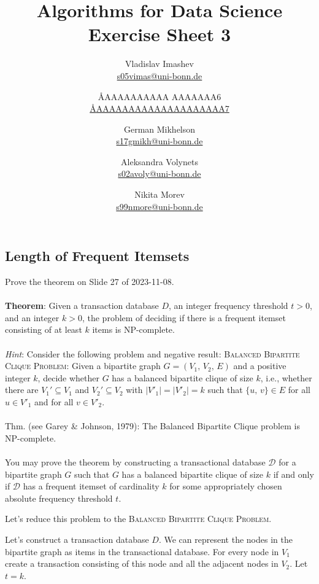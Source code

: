 \documentclass{article}
\title{Algorithms for Data Science \\ Exercise Sheet 3}
\author{
  Vladislav Imashev \\ \href{mailto:s05vimas@uni-bonn.de}{s05vimas@uni-bonn.de} \and
  \AA{AAAAAAAAAA AAAAAAA}{6} \\ \href{mailto:\AA{AAAAAAAAAAAAAAAAAAAA}{7}}{\AA{AAAAAAAAAAAAAAAAAAAA}{7}} \and
  German Mikhelson \\ \href{mailto:s17gmikh@uni-bonn.de}{s17gmikh@uni-bonn.de} \and
  Aleksandra Volynets \\ \href{mailto:s02avoly@uni-bonn.de}{s02avoly@uni-bonn.de} \and
  Nikita Morev \\ \href{mailto:s99nmore@uni-bonn.de}{s99nmore@uni-bonn.de}
}
\begin{document}
  \maketitle

  \setcounter{section}{3}
  \subsection{Length of Frequent Itemsets}
  \begin{centerframebox}
    Prove the theorem on Slide 27 of 2023-11-08.
    \\\\
    \textbf{Theorem}:
    Given a transaction database $D$, an integer frequency threshold $t > 0$, and an integer $k > 0$,
    the problem of deciding if there is a frequent itemset consisting of at least $k$ items is NP-complete.
    \\\\
    \textit{Hint}: Consider the following problem and negative result:
    \textsc{Balanced Bipartite Clique Problem}:
    Given a bipartite graph $G = (V_1,\, V_2,\, E)$ and a positive integer $k$, decide whether $G$ has a balanced
    bipartite clique of size $k$, i.e., whether there are $V_1' \subseteq V_1$ and $V_2' \subseteq V_2$
    with $|V'_1| = |V'_2| = k$ such that $\{u,\, v\} \in E$ for all $u \in V'_1$ and for all $v \in V'_2$.
    \\\\
    Thm. (see Garey \& Johnson, 1979): The Balanced Bipartite Clique problem is NP-complete.
    \\\\
    You may prove the theorem by constructing a transactional database $\mathcal{D}$
    for a bipartite graph $G$ such that $G$ has a balanced bipartite clique of
    size $k$ if and only if $\mathcal{D}$ has a frequent itemset of cardinality $k$ for some
    appropriately chosen absolute frequency threshold $t$.
  \end{centerframebox}
  Let's reduce this problem to the \textsc{Balanced Bipartite Clique Problem}.

  Let's construct a transaction database $D$. We can represent the nodes in the bipartite graph as items in the transactional database. For every node in $V_1$ create a transaction consisting of this node and all the adjacent nodes in $V_2$. Let $t = k$.
\end{document}
